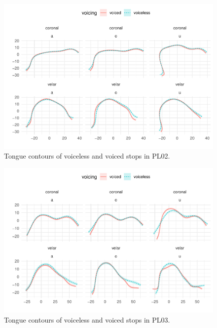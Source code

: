 \documentclass[11pt,]{article}
\begin{document}
\begin{figure}

{\centering \includegraphics[width=.8\textwidth]{2018-polar-gam_files/figure-latex/Figure12} 

}

\caption{Tongue contours of voiceless and voiced stops in PL02.}\label{f:Figure12}
\end{figure}

\begin{figure}

{\centering \includegraphics[width=.8\textwidth]{2018-polar-gam_files/figure-latex/Figure13} 

}

\caption{Tongue contours of voiceless and voiced stops in PL03.}\label{f:Figure13}
\end{figure}
\end{document}
